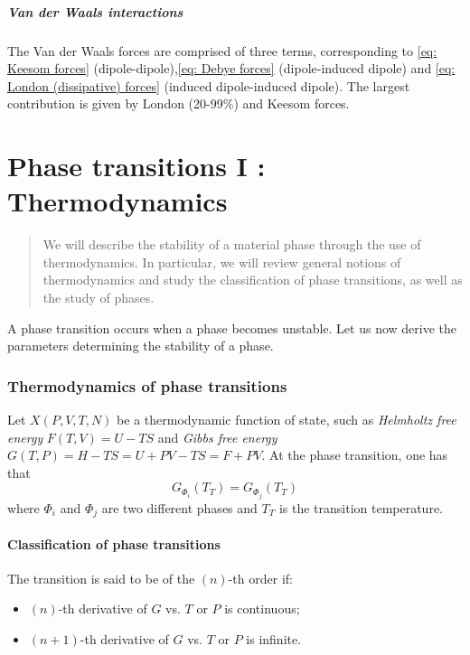 \documentclass[../phys-f308.tex]{subfiles}
\begin{document}
    \subsubsection{Van der Waals interactions}

    The Van der Waals forces are comprised of three terms, corresponding to \eqref{eq: Keesom forces} (dipole-dipole),\eqref{eq: Debye forces} (dipole-induced dipole) and \eqref{eq: London (dissipative) forces} (induced dipole-induced dipole). The largest contribution is given by London (20-99\%) and Keesom forces.

    \part{Phase transitions I : Thermodynamics}

    \begin{abstract}
        We will describe the stability of a material phase through the use of thermodynamics. In particular, we will review general notions of thermodynamics and study the classification of phase transitions, as well as the study of phases.
    \end{abstract}

    A phase transition occurs when a phase becomes unstable. Let us now derive the parameters determining the stability of a phase.

    \section{Thermodynamics of phase transitions}

    Let $X(P,V,T,N)$ be a thermodynamic function of state, such as \emph{Helmholtz free energy} $F(T,V) = U-TS$ and \emph{Gibbs free energy} $G(T,P) = H - TS = U+PV-TS = F+PV$. At the phase transition, one has that 
    \begin{equation}
        G_{\Phi_i}(T_T) = G_{\Phi_j}(T_T)
    \end{equation} 
    where $\Phi_i$ and $\Phi_j$ are two different phases and $T_T$ is the transition temperature.

    \subsection{Classification of phase transitions}

    \begin{definition}\label{def: phase transition}
        The transition is said to be of the $(n)$-th order if:
        \begin{itemize}
            \item $(n)$-th derivative of $G$ vs. $T$ or $P$ is continuous;
            \item $(n+1)$-th derivative of $G$ vs. $T$ or $P$ is infinite.
        \end{itemize}
    \end{definition}
\end{document}
